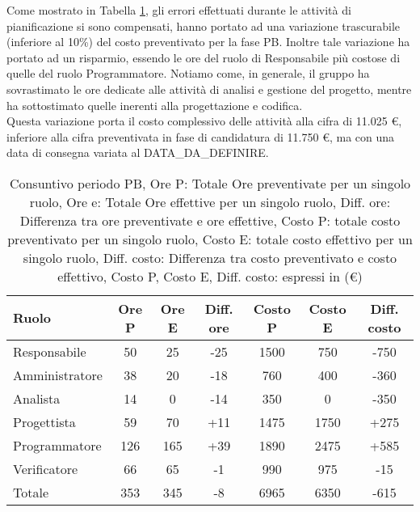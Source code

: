 Come mostrato in Tabella \ref{t:differenza}, gli errori effettuati durante le attività di pianificazione si sono compensati, hanno portato ad una variazione trascurabile (inferiore al 10\%) del costo preventivato per la fase PB.
Inoltre tale variazione ha portato ad un risparmio, essendo le ore del ruolo di Responsabile più costose di quelle del ruolo Programmatore.
Notiamo come, in generale, il gruppo ha sovrastimato le ore dedicate alle attività di analisi e gestione del progetto, mentre ha sottostimato quelle inerenti alla progettazione e codifica. \\
Questa variazione porta il costo complessivo delle attività alla cifra di 11.025 \euro, inferiore alla cifra preventivata in fase di candidatura di 11.750 \euro, ma con una data di consegna variata al DATA\_DA\_DEFINIRE.

\begin{table}[H]
	\centering
	\begin{tabular}{l|c|c|c|c|c|c}
		\textbf{Ruolo} & \textbf{Ore P} & \textbf{Ore E} & \textbf{Diff. ore} & \textbf{Costo P} & \textbf{Costo E} & \textbf{Diff. costo} \\
		\hline
		Responsabile   & 50             & 25             & -25                & 1500             & 750              & -750                 \\
		Amministratore & 38             & 20             & -18                & 760              & 400              & -360                 \\
		Analista       & 14             & 0              & -14                & 350              & 0                & -350                 \\
		Progettista    & 59             & 70             & +11                & 1475             & 1750             & +275                 \\
		Programmatore  & 126            & 165            & +39                & 1890             & 2475             & +585                 \\
		Verificatore   & 66             & 65             & -1                 & 990              & 975              & -15                  \\
		\hline
		Totale         & 353            & 345            & -8                 & 6965             & 6350             & -615                 \\
		\hline
	\end{tabular}
	\caption{Consuntivo periodo PB, Ore P: Totale Ore preventivate per un singolo ruolo, Ore e: Totale Ore effettive per un singolo ruolo,
		Diff. ore: Differenza tra ore preventivate e ore effettive, Costo P: totale costo preventivato per un singolo ruolo,
		Costo E: totale costo effettivo per un singolo ruolo,  Diff. costo: Differenza tra costo preventivato e costo effettivo,
		Costo P, Costo E, Diff. costo: espressi in (\euro)}
	\label{t:differenza}
\end{table}
